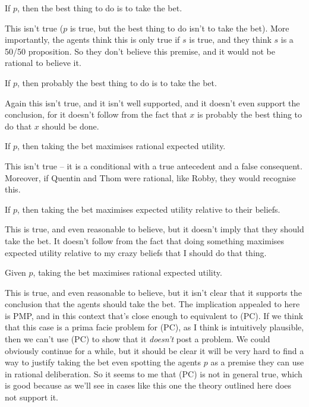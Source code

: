 \begin{itemize*}
\item If \(p\), then the best thing to do is to take the bet.
\end{itemize*}

\noindent This isn't true (\(p\) is true, but the best thing to do isn't to take the bet). More importantly, the agents think this is only true if \(s\) is true, and they think \(s\) is a 50/50 proposition. So they don't believe this premise, and it would not be rational to believe it.

\begin{itemize*}
\item If \(p\), then probably the best thing to do is to take the bet.
\end{itemize*}

\noindent Again this isn't true, and it isn't well supported, and it doesn't even support the conclusion, for it doesn't follow from the fact that \(x\) is probably the best thing to do that \(x\) should be done.

\begin{itemize*}
\item If \(p\), then taking the bet maximises rational expected utility.
\end{itemize*}

\noindent This isn't true -- it is a conditional with a true antecedent and a false consequent. Moreover, if Quentin and Thom were rational, like Robby, they would recognise this.

\begin{itemize*}
\item If \(p\), then taking the bet maximises expected utility relative to their beliefs.
\end{itemize*}

\noindent This is true, and even reasonable to believe, but it doesn't imply that they should take the bet. It doesn't follow from the fact that doing something maximises expected utility relative to my crazy beliefs that I should do that thing.

\begin{itemize*}
\item Given \(p\), taking the bet maximises rational expected utility.
\end{itemize*}

\noindent This is true, and even reasonable to believe, but it isn't clear that it supports the conclusion that the agents should take the bet. The implication appealed to here is PMP, and in this context that's close enough to equivalent to (PC). If we think that this case is a prima facie problem for (PC), as I think is intuitively plausible, then we can't use (PC) to show that it \textit{doesn't} post a problem. We could obviously continue for a while, but it should be clear it will be very hard to find a way to justify taking the bet even spotting the agents \(p\) as a premise they can use in rational deliberation. So it seems to me that (PC) is not in general true, which is good because as we'll see in cases like this one the theory outlined here does not support it.


